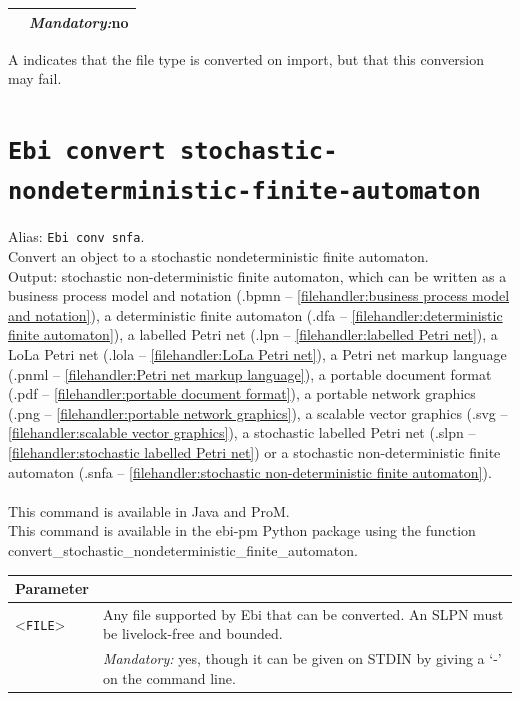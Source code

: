 {\begin{tabularx}{\linewidth}{lX}
&\textit{Mandatory:}\quad no\\
\bottomrule
\end{tabularx}
A \textdagger{} indicates that the file type is converted on import, but that this conversion may fail.
\clearpage\section{\texttt{Ebi convert stochastic-nondeterministic-finite-automaton}}
\label{command:Ebi convert stochastic-nondeterministic-finite-automaton}
Alias: \texttt{Ebi conv snfa}.\\
Convert an object to a stochastic nondeterministic finite automaton.\\
\noindent Output: stochastic non-deterministic finite automaton, which can be written as a business process model and notation (.bpmn -- \cref{filehandler:business process model and notation}), a deterministic finite automaton (.dfa -- \cref{filehandler:deterministic finite automaton}), a labelled Petri net (.lpn -- \cref{filehandler:labelled Petri net}), a LoLa Petri net (.lola -- \cref{filehandler:LoLa Petri net}), a Petri net markup language (.pnml -- \cref{filehandler:Petri net markup language}), a portable document format (.pdf -- \cref{filehandler:portable document format}), a portable network graphics (.png -- \cref{filehandler:portable network graphics}), a scalable vector graphics (.svg -- \cref{filehandler:scalable vector graphics}), a stochastic labelled Petri net (.slpn -- \cref{filehandler:stochastic labelled Petri net}) or a stochastic non-deterministic finite automaton (.snfa -- \cref{filehandler:stochastic non-deterministic finite automaton}).\\
\\This command is available in Java and ProM.
\\This command is available in the ebi-pm Python package using the function convert\_stochastic\_nondeterministic\_finite\_automaton.
\begin{tabularx}{\linewidth}{lX}
\toprule
Parameter \\\midrule
<\texttt{FILE}>&Any file supported by Ebi that can be converted. An SLPN must be livelock-free and bounded.\\
&\textit{Mandatory:} \quad yes, though it can be given on STDIN by giving a `-' on the command line.\\

\end{tabularx}}
